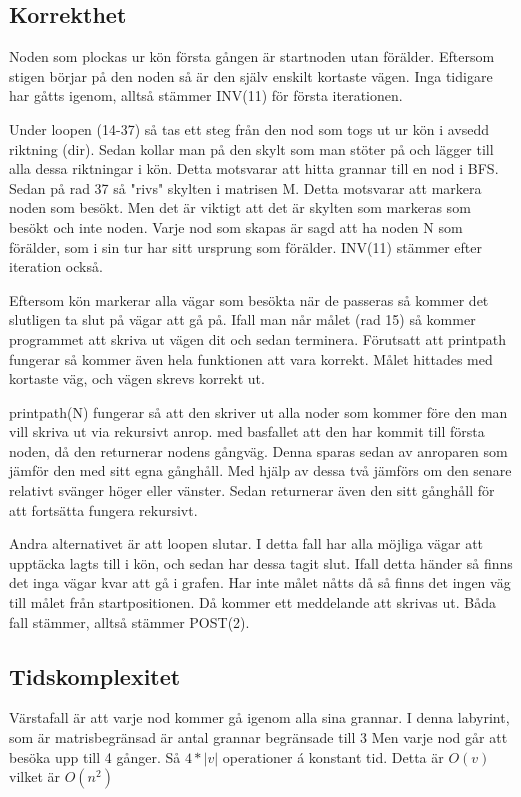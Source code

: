 \documentclass[a4paper,10pt,twoside]{article}
\begin{document}
\subsection{Korrekthet}

Noden som plockas ur kön första gången är startnoden utan förälder. Eftersom stigen börjar på den noden så är den själv enskilt kortaste vägen. Inga tidigare har gåtts igenom, alltså stämmer INV(11) för första iterationen.

Under loopen (14-37) så tas ett steg från den nod som togs ut ur kön i avsedd riktning (dir). Sedan kollar man på den skylt som man stöter på och lägger till alla dessa riktningar i kön. Detta motsvarar att hitta grannar till en nod i BFS. Sedan på rad 37 så "rivs" skylten i matrisen M. Detta motsvarar att markera noden som besökt. Men det är viktigt att det är skylten som markeras som besökt och inte noden. Varje nod som skapas är sagd att ha noden N som förälder, som i sin tur har sitt ursprung som förälder. INV(11) stämmer efter iteration också.

Eftersom kön markerar alla vägar som besökta när de passeras så kommer det slutligen ta slut på vägar att gå på. Ifall man når målet (rad 15) så kommer programmet att skriva ut vägen dit och sedan terminera. Förutsatt att printpath fungerar så kommer även hela funktionen att vara korrekt. Målet hittades med kortaste väg, och vägen skrevs korrekt ut.

printpath(N) fungerar så att den skriver ut alla noder som kommer före den man vill skriva ut via rekursivt anrop. med basfallet att den har kommit till första noden, då den returnerar nodens gångväg. Denna sparas sedan av anroparen som jämför den med sitt egna gånghåll. Med hjälp av dessa två jämförs om den senare relativt svänger höger eller vänster. Sedan returnerar även den sitt gånghåll för att fortsätta fungera rekursivt.

Andra alternativet är att loopen slutar. I detta fall har alla möjliga vägar att upptäcka lagts till i kön, och sedan har dessa tagit slut. Ifall detta händer så finns det inga vägar kvar att gå i grafen. Har inte målet nåtts då så finns det ingen väg till målet från startpositionen. Då kommer ett meddelande att skrivas ut. Båda fall stämmer, alltså stämmer POST(2).

\subsection{Tidskomplexitet}

Värstafall är att varje nod kommer gå igenom alla sina grannar. I denna labyrint, som är matrisbegränsad är antal grannar begränsade till 3 Men varje nod går att besöka upp till 4 gånger. Så $4 * |v|$ operationer á konstant tid. Detta är $O(v)$ vilket är $O(n^2)$
\end{document}
